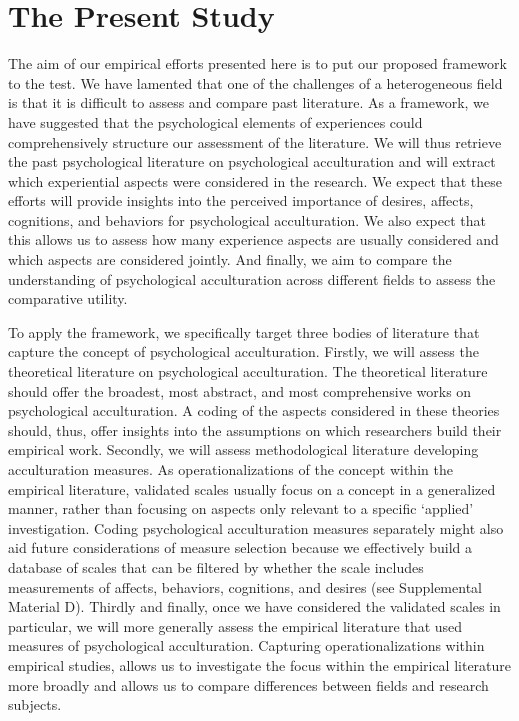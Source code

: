 \documentclass[man, 12pt, a4paper, mask]{apa7}
\newcommand\Warning[1][2ex]{%
  \renewcommand\stacktype{L}%
  \scaleto{\stackon[1.3pt]{\color{red}$\triangle$}{\tiny\bfseries !}}{#1}}%
\begin{document}
\section{The Present Study}


The aim of our empirical efforts presented here is to put our proposed framework to the test. We have lamented that one of the challenges of a heterogeneous field is that it is difficult to assess and compare past literature. As a framework, we have suggested that the psychological elements of experiences could comprehensively structure our assessment of the literature. We will thus retrieve the past psychological literature on psychological acculturation and will extract which experiential aspects were considered in the research. We expect that these efforts will provide insights into the perceived importance of desires, affects, cognitions, and behaviors for psychological acculturation. We also expect that this allows us to assess how many experience aspects are usually considered and which aspects are considered jointly. And finally, we aim to compare the understanding of psychological acculturation across different fields to assess the comparative utility. 

To apply the framework, we specifically target three bodies of literature that capture the concept of psychological acculturation. Firstly, we will assess the theoretical literature on psychological acculturation. The theoretical literature should offer the broadest, most abstract, and most comprehensive works on psychological acculturation. A coding of the aspects considered in these theories should, thus, offer insights into the assumptions on which researchers build their empirical work.
Secondly, we will assess methodological literature developing acculturation measures. As operationalizations of the concept within the empirical literature, validated scales usually focus on a concept in a generalized manner, rather than focusing on aspects only relevant to a specific `applied' investigation. Coding psychological acculturation measures separately might also aid future considerations of measure selection because we effectively build a database of scales that can be filtered by whether the scale includes measurements of affects, behaviors, cognitions, and desires (see Supplemental Material D). 
Thirdly and finally, once we have considered the validated scales in particular, we will more generally assess the empirical literature that used measures of psychological acculturation. Capturing operationalizations within empirical studies, allows us to investigate the focus within the empirical literature more broadly and allows us to compare differences between fields and research subjects.
\end{document}
